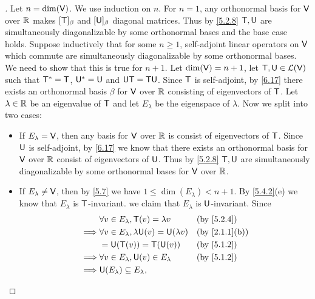 \begin{proof}[]
  Let \(n = \dim(\mathsf{V})\).
  We use induction on \(n\).
  For \(n = 1\), any orthonormal basis for \(\mathsf{V}\) over \(\mathbb{R}\) makes \([\mathsf{T}]_{\beta}\) and \([\mathsf{U}]_{\beta}\) diagonal matrices.
  Thus by \cref{5.2.8} \(\mathsf{T}, \mathsf{U}\) are simultaneously diagonalizable by some orthonormal bases and the base case holds.
  Suppose inductively that for some \(n \geq 1\), self-adjoint linear operators on \(\mathsf{V}\) which commute are simultaneously diagonalizable by some orthonormal bases.
  We need to show that this is true for \(n + 1\).
  Let \(\dim(\mathsf{V}) = n + 1\), let \(\mathsf{T}, \mathsf{U} \in \mathcal{L}(\mathsf{V})\) such that \(\mathsf{T}^* = \mathsf{T}\), \(\mathsf{U}^* = \mathsf{U}\) and \(\mathsf{U} \mathsf{T} = \mathsf{T} \mathsf{U}\).
  Since \(\mathsf{T}\) is self-adjoint, by \cref{6.17} there exists an orthonormal basis \(\beta\) for \(\mathsf{V}\) over \(\mathbb{R}\) consisting of eigenvectors of \(\mathsf{T}\).
  Let \(\lambda \in \mathbb{R}\) be an eigenvalue of \(\mathsf{T}\) and let \(E_{\lambda}\) be the eigenspace of \(\lambda\).
  Now we split into two cases:
  \begin{itemize}
    \item If \(E_{\lambda} = \mathsf{V}\), then any basis for \(\mathsf{V}\) over \(\mathbb{R}\) is consist of eigenvectors of \(\mathsf{T}\).
          Since \(\mathsf{U}\) is self-adjoint, by \cref{6.17} we know that there exists an orthonormal basis for \(\mathsf{V}\) over \(\mathbb{R}\) consist of eigenvectors of \(\mathsf{U}\).
          Thus by \cref{5.2.8} \(\mathsf{T}, \mathsf{U}\) are simultaneously diagonalizable by some orthonormal bases for \(\mathsf{V}\) over \(\mathbb{R}\).
    \item If \(E_{\lambda} \neq \mathsf{V}\), then by \cref{5.7} we have \(1 \leq \dim(E_{\lambda}) < n + 1\).
          By \cref{5.4.2}(e) we know that \(E_{\lambda}\) is \(\mathsf{T}\)-invariant.
          we claim that \(E_{\lambda}\) is \(\mathsf{U}\)-invariant.
          Since
          \begin{align*}
                     & \forall v \in E_{\lambda}, \T(v) = \lambda v             &  & \text{(by \cref{5.2.4})}    \\
            \implies & \forall v \in E_{\lambda}, \lambda \U(v) = \U(\lambda v) &  & \text{(by \cref{2.1.1}(b))} \\
                     & = \U(\T(v)) = \T(\U(v))                                  &  & \text{(by \cref{5.1.2})}    \\
            \implies & \forall v \in E_{\lambda}, \U(v) \in E_{\lambda}         &  & \text{(by \cref{5.1.2})}    \\
            \implies & \U(E_{\lambda}) \subseteq E_{\lambda},
          \end{align*}

\end{itemize}
\end{proof}
